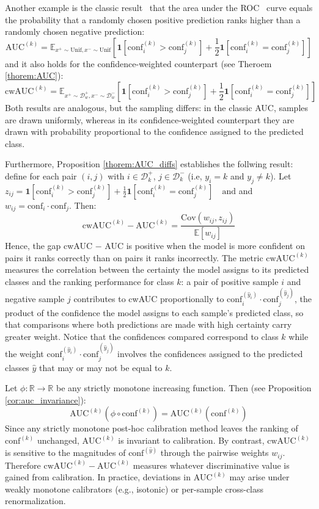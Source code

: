 \documentclass{article}
\theoremstyle{plain}
\theoremstyle{definition}
\theoremstyle{remark}
\begin{document}
Another example is the classic result~\cite{mohri2018auc} that the area under the ROC~\cite{green1966signal} curve equals the probability that a randomly chosen positive prediction ranks higher than a randomly chosen negative prediction: \[
 \text{AUC}^{(k)} = \mathbb{E}_{x^+ \sim \text{Unif}, x^- \sim \text{Unif}} \left[ \mathbf{1}[\text{conf}_i^{(k)} > \text{conf}_j^{(k)}] + \frac{1}{2}\mathbf{1}[\text{conf}_i^{(k)} = \text{conf}_j^{(k)}] \right]
\]
and it also holds for the confidence-weighted counterpart (see Theroem \ref{thorem:AUC}):
\[
 \text{cwAUC}^{(k)} = \mathbb{E}_{x^+ \sim \mathcal{D}^+_w, x^- \sim \mathcal{D}^-_w} \left[ \mathbf{1}[\text{conf}_i^{(k)} > \text{conf}_j^{(k)}] + \frac{1}{2}\mathbf{1}[\text{conf}_i^{(k)} = \text{conf}_j^{(k)}] \right]
\] 
Both results are analogous, but the sampling differs: in the classic AUC, samples are drawn uniformly, whereas in its confidence-weighted counterpart they are drawn with probability proportional to the confidence assigned to the predicted class.
 
Furthermore, Proposition \ref{thorem:AUC_diffs} establishes the follwing result: define for each pair $(i,j)$ with $i \in \mathcal{D}^+_k$, $j \in \mathcal{D}^-_k$  (i.e, $y_i = k$ and $y_j \not= k$). Let $z_{ij} =\mathbf{1}[\text{conf}_i^{(k)} > \text{conf}_j^{(k)}] + \frac{1}{2}\mathbf{1}[\text{conf}_i^{(k)} = \text{conf}_j^{(k)}] \quad \text{and}$ and $w_{ij} = \text{conf}_i \cdot \text{conf}_j$. Then: \[
\text{cwAUC}^{(k)} - \text{AUC}^{(k)} = \frac{\text{Cov}(w_{ij}, z_{ij})}{\mathbb{E}[w_{ij}]}
\]
Hence, the gap cwAUC $-$ AUC is positive when the model is more confident on pairs it ranks correctly than on pairs it ranks incorrectly.   The metric $\text{cwAUC}^{(k)}$ measures the correlation between the certainty the model assigns to its predicted classes and the ranking performance for class $k$: a pair of positive sample $i$ and negative sample $j$ contributes to cwAUC proportionally to $\text{conf}_i^{(\hat{y}_i)} \cdot \text{conf}_j^{(\hat{y}_j)}$, the product of the confidence the model assigns to each sample's predicted class, so that comparisons where both predictions are made with high certainty carry greater weight.   Notice that the confidences compared correspond to class $k$ while the weight $ \text{conf}_i^{(\hat{y}_i)} \cdot \text{conf}_j^{(\hat{y}_j)} $ involves the confidences assigned to the predicted classes $\hat{y}$ that may or may not be equal to $k$.

Let $\phi : \mathbb{R} \to \mathbb{R}$ be any strictly monotone increasing function. Then (see Proposition \ref{cor:auc_invariance}):
\[
\text{AUC}^{(k)}\!\left(\phi \circ \text{conf}^{(k)}\right) = \text{AUC}^{(k)}\!\left(\text{conf}^{(k)}\right)
\]
Since any strictly monotone post-hoc calibration method leaves the ranking of $\text{conf}^{(k)}$ unchanged, $\text{AUC}^{(k)}$ is invariant to calibration.  By contrast, $\text{cwAUC}^{(k)}$ is sensitive to the magnitudes of $\text{conf}^{(\hat{y})}$ through the pairwise weights $w_{ij}$. Therefore $\text{cwAUC}^{(k)} - \text{AUC}^{(k)}$ measures whatever discriminative value is gained from calibration. In practice, deviations in $\text{AUC}^{(k)}$ may arise under weakly monotone calibrators (e.g., isotonic) or per-sample cross-class renormalization.
\end{document}
